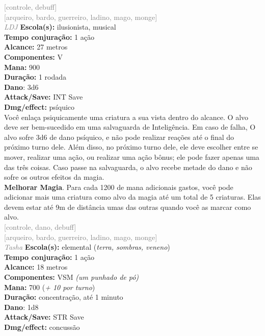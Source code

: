 \documentclass{RPG_Adventure}[2021/10/20]
\begin{document}
{\scriptsize \textcolor{gray}{[controle, debuff]\\}}
{\scriptsize \textcolor{gray}{[arqueiro, bardo, guerreiro, ladino, mago, monge]\\}}
{\tiny \textcolor{gray}{\textit{LDJ}}}\jump{}
{\small \t \textbf{Escola(s):} ilusionista, musical\\\t \textbf{Tempo conjuração:} 1 ação\\\t \textbf{Alcance:} 27 metros\\\t \textbf{Componentes:} V\\\t \textbf{Mana:} 900\\\t \textbf{Duração:} 1 rodada\\\t \textbf{Dano}: 3d6\\\t \textbf{Attack/Save:} INT Save\\\t \textbf{Dmg/effect:} psíquico\\}
{\normalsize Você enlaça psiquicamente uma criatura a sua vista dentro do alcance. O alvo deve ser bem-sucedido em uma salvaguarda de Inteligência. Em caso de falha, O alvo sofre 3d6 de dano psíquico, e não pode realizar reações até o final do próximo turno dele. Além disso, no próximo turno dele, ele deve escolher entre se mover, realizar uma ação, ou realizar uma ação bônus; ele pode fazer apenas uma das três coisas. Caso passe na salvaguarda, o alvo recebe metade do dano e não sofre os outros efeitos da magia.\\\t \textbf{Melhorar Magia}. Para cada 1200 de mana adicionais gastos, você pode adicionar mais uma criatura como alvo da magia até um total de 5 criaturas. Elas devem estar até 9m de distância umas das outras quando você as marcar como alvo.\\}
{\scriptsize \textcolor{gray}{[controle, dano, debuff]\\}}
{\scriptsize \textcolor{gray}{[arqueiro, bardo, guerreiro, ladino, mago, monge]\\}}
{\tiny \textcolor{gray}{\textit{Tasha}}}\jump{}
{\small \t \textbf{Escola(s):} elemental (\textit{terra, sombras, veneno})\\\t \textbf{Tempo conjuração:} 1 ação\\\t \textbf{Alcance:} 18 metros\\\t \textbf{Componentes:} VSM \textit{(um punhado de pó)}\\\t \textbf{Mana:} 700 (\textit{+ 10 por turno})\\\t \textbf{Duração:} concentração, até 1 minuto\\\t \textbf{Dano}: 1d8\\\t \textbf{Attack/Save:} STR Save\\\t \textbf{Dmg/effect:} concussão\\}
\end{document}
